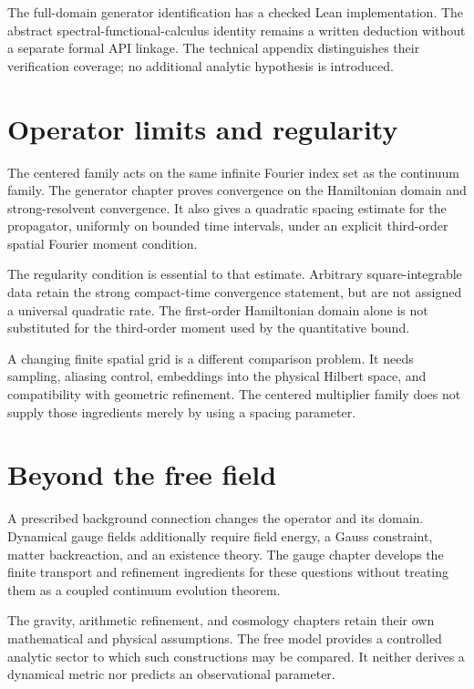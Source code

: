 The full-domain generator identification has a checked Lean implementation. The abstract spectral-functional-calculus identity remains a written deduction without a separate formal API linkage. The technical appendix distinguishes their verification coverage; no additional analytic hypothesis is introduced.

\section{Operator limits and regularity}
The centered family acts on the same infinite Fourier index set as the continuum family. The generator chapter proves convergence on the Hamiltonian domain and strong-resolvent convergence. It also gives a quadratic spacing estimate for the propagator, uniformly on bounded time intervals, under an explicit third-order spatial Fourier moment condition.

The regularity condition is essential to that estimate. Arbitrary square-integrable data retain the strong compact-time convergence statement, but are not assigned a universal quadratic rate. The first-order Hamiltonian domain alone is not substituted for the third-order moment used by the quantitative bound.

A changing finite spatial grid is a different comparison problem. It needs sampling, aliasing control, embeddings into the physical Hilbert space, and compatibility with geometric refinement. The centered multiplier family does not supply those ingredients merely by using a spacing parameter.

\section{Beyond the free field}
A prescribed background connection changes the operator and its domain. Dynamical gauge fields additionally require field energy, a Gauss constraint, matter backreaction, and an existence theory. The gauge chapter develops the finite transport and refinement ingredients for these questions without treating them as a coupled continuum evolution theorem.

The gravity, arithmetic refinement, and cosmology chapters retain their own mathematical and physical assumptions. The free model provides a controlled analytic sector to which such constructions may be compared. It neither derives a dynamical metric nor predicts an observational parameter.
